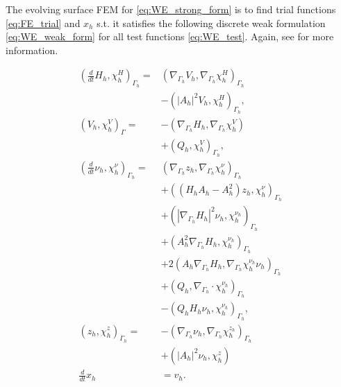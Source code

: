 

The evolving surface FEM for \eqref{eq:WE_strong_form} is to find trial functions \eqref{eq:FE_trial} and $x_{h} $ s.t. it satisfies the following discrete weak formulation \eqref{eq:WE_weak_form} for
all test functions \eqref{eq:WE_test}. Again, see \cite{kovacs2021convergent} for more information.

\begin{subequations}
\label{eq:FEM}
 \begin{align}
\left( \frac{d}{dt}H_{h}, \chi_{h} ^{H} \right)_{\Gamma_{h} } =&  \left( \nabla _{\Gamma_{h} } V_{h}, \nabla _{\Gamma_{h} }\chi_{h} ^{H} \right) _{\Gamma_{h} } \nonumber \\
                                                   &- \left( \left\lvert A_{h} \right\rvert ^2 V_{h}, \chi_{h} ^{H} \right) _{\Gamma_{h} },   \\
\left( V_{h}, \chi_{h} ^{V} \right)_{\Gamma } =& -\left( \nabla _{\Gamma_{h} } H_{h}, \nabla _{\Gamma_{h} } \chi_{h} ^{V} \right) \nonumber \\
 & + \left( Q_{h}, \chi_{h} ^{V} \right)_{\Gamma_{h} },   \\
\left( \frac{d}{dt} \nu_{h} , \chi_{h} ^{\nu } \right)_{\Gamma_{h} } =& \left( \nabla _{\Gamma_{h} }z_{h}, \nabla _{\Gamma_{h} } \chi_{h} ^{\nu } \right) _{\Gamma_{h} }\nonumber   \\
 & + \left( ( H_{h}A_{h} - A_{h}^2  )z_{h},\chi_{h}^\nu  \right)_{\Gamma_{h} }   \nonumber \\
 & + \left( \left\lvert \nabla _{\Gamma_{h} } H_{h} \right\rvert^2 \nu_{h} , \chi_{h} ^{\nu_{h} }  \right)_{\Gamma_{h}} \nonumber  \\
 & + \left(  A_{h}^2\nabla _{\Gamma_{h} } H_{h}, \chi_{h} ^{\nu_{h} }  \right)_{\Gamma_{h}} \nonumber  \\
 & + 2 \left( A_{h} \nabla _{\Gamma_{h} } H_{h}, \nabla _{\Gamma_{h} } \chi_{h} ^{\nu_{h} } \nu_{h}  \right)_{\Gamma_{h}} \nonumber    \\
 &  + \left( Q_{h}, \nabla _{\Gamma_{h} } \cdot \chi_{h} ^{\nu_{h} }  \right)_{\Gamma_{h} } \nonumber  \\
  &- \left( Q_{h}H_{h}\nu_{h} , \chi_{h} ^{\nu_{h} } \right) _{\Gamma_{h}},\\
\left( z_{h}, \chi_{h} ^{z} \right) _{\Gamma_{h} }  =& - \left( \nabla _{\Gamma_{h} } \nu_{h} , \nabla _{\Gamma_{h} } \chi_{h} ^{z_{h}} \right)_{\Gamma_{h}} \nonumber \\
 & + \left( \left\lvert A_{h} \right\rvert ^2 \nu_{h} , \chi_{h} ^{z} \right) \\
\frac{d}{dt}x_h &= v_h
 .\end{align}
\end{subequations}
